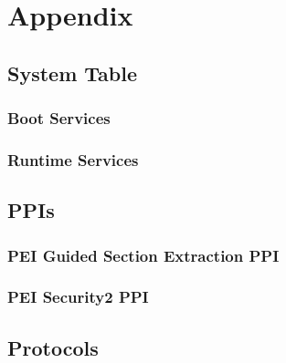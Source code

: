 
\chapter{Appendix}

\section{System Table}

\clearpage

\subsection{Boot Services}

\clearpage

\subsection{Runtime Services}

\clearpage

\section{\acsp{PPI}}

\subsection{\acs{PEI} Guided Section Extraction \acs{PPI}}

\clearpage

\subsection{\acs{PEI} Security2 \acs{PPI}}

\clearpage

\section{Protocols}

